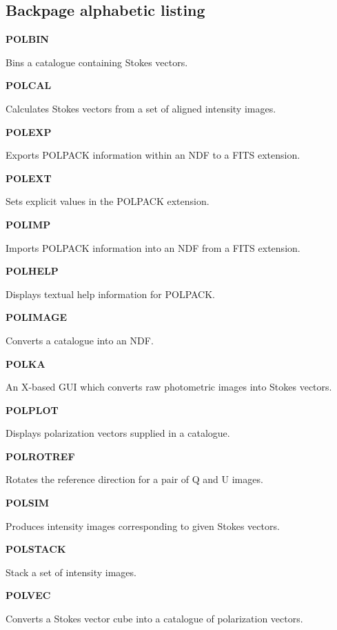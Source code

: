 \documentclass[twoside,11pt]{starlink}
\providecommand{\quickdes}[3]{
                         \parbox{1.1in}{\textbf{#1}}
                         \parbox{4.4in}{\raggedright #2 \dotfill}
                         \parbox{0.6in}{\pageref{#3}}
                         \vspace*{0.2in}}
\providecommand{\latexonlysection}[1]{\section{#1}}
\begin{document}
\begin{latexonly}

\cleardoublepage

\latexonlysection{Backpage alphabetic listing}

%
%

\quickdes{POLBIN}{Bins a catalogue containing Stokes vectors.}{POLBIN}

\quickdes{POLCAL}{Calculates Stokes vectors from a set of aligned intensity images.}{POLCAL}

\quickdes{POLEXP}{Exports POLPACK information within an NDF to a FITS extension.}{POLEXP}

\quickdes{POLEXT}{Sets explicit values in the POLPACK extension.}{POLEXT}

\quickdes{POLIMP}{Imports POLPACK information into an NDF from a FITS extension.}{POLEXP}

\quickdes{POLHELP}{Displays textual help information for POLPACK.}{POLHELP}

\quickdes{POLIMAGE}{Converts a catalogue into an NDF.}{POLIMAGE}

\quickdes{POLKA}{An X-based GUI which converts raw photometric images into Stokes vectors.}{POLKA}

\quickdes{POLPLOT}{Displays polarization vectors supplied in a catalogue.}{POLPLOT}

\quickdes{POLROTREF}{Rotates the reference direction for a pair of Q and U images.}{POLROTREF}

\quickdes{POLSIM}{Produces intensity images corresponding to given Stokes vectors.}{POLSIM}

\quickdes{POLSTACK}{Stack a set of intensity images.}{POLSTACK}

\quickdes{POLVEC}{Converts a Stokes vector cube into a catalogue of polarization vectors.}{POLVEC}

\end{latexonly}
\end{document}
